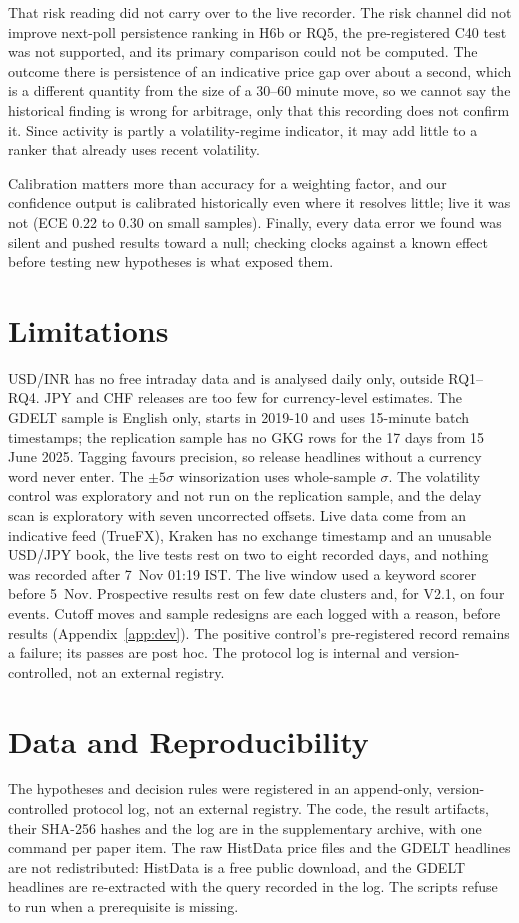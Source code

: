 \documentclass[conference]{IEEEtran}
\begin{document}
That risk reading did not carry over to the live recorder. The risk channel did not improve
next-poll persistence ranking in H6b or RQ5, the pre-registered C40 test was not supported, and its
primary comparison could not be computed. The outcome there is persistence of an indicative price
gap over about a second, which is a different quantity from the size of a 30--60 minute move, so
we cannot say the historical finding is wrong for arbitrage, only that this recording does not
confirm it. Since activity is partly a volatility-regime indicator, it may add little to a ranker
that already uses recent volatility.

Calibration matters more than accuracy for a weighting factor, and our confidence output is
calibrated historically even where it resolves little; live it was not (ECE 0.22 to 0.30 on small
samples). Finally, every data error we found was silent and pushed results toward a null; checking
clocks against a known effect before testing new hypotheses is what exposed them.

\section{Limitations}
USD/INR has no free intraday data and is analysed daily only, outside RQ1--RQ4. JPY and CHF
releases are too few for currency-level estimates. The GDELT sample is English only, starts in
2019-10 and uses 15-minute batch timestamps; the replication sample has no GKG rows for the 17
days from 15 June 2025. Tagging favours precision, so release headlines without a currency word never enter.
The $\pm5\sigma$ winsorization uses whole-sample $\sigma$. The volatility control was
exploratory and not run on the replication sample, and the delay scan is exploratory with seven
uncorrected offsets. Live data come from an indicative feed (TrueFX), Kraken
has no exchange timestamp and an unusable USD/JPY book, the live tests rest on two to eight recorded
days, and nothing was recorded after 7~Nov 01:19 IST. The live window used a keyword scorer
before 5~Nov. Prospective results rest on few date clusters and, for V2.1, on four events. Cutoff
moves and sample redesigns are each logged with a reason, before results (Appendix~\ref{app:dev}).
The positive control's pre-registered record remains a failure; its passes are post hoc. The
protocol log is internal and version-controlled, not an external registry.

\section{Data and Reproducibility}\label{sec:repro}
The hypotheses and decision rules were registered in an append-only, version-controlled protocol
log, not an external registry. The code, the result artifacts, their SHA-256 hashes and the log are
in the supplementary archive, with one command per paper item. The raw HistData price files and
the GDELT headlines are not redistributed: HistData is a free public download, and the GDELT
headlines are re-extracted with the query recorded in the log. The scripts refuse to run when a
prerequisite is missing.
\end{document}
